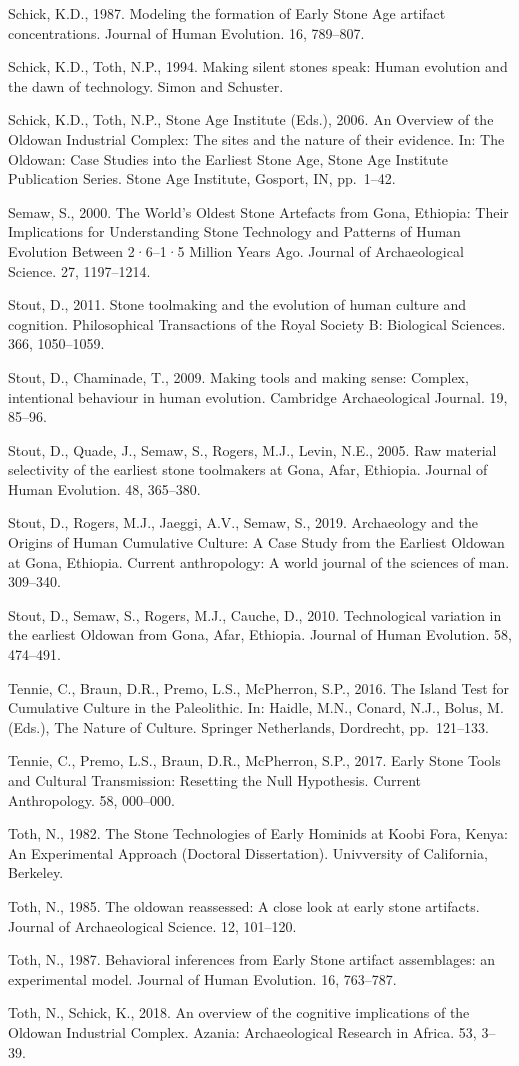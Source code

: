 \documentclass[]{elsarticle} %
\begin{document}
Schick, K.D., 1987. Modeling the formation of Early Stone Age artifact
concentrations. Journal of Human Evolution. 16, 789--807.

Schick, K.D., Toth, N.P., 1994. Making silent stones speak: Human
evolution and the dawn of technology. Simon and Schuster.

Schick, K.D., Toth, N.P., Stone Age Institute (Eds.), 2006. An Overview
of the Oldowan Industrial Complex: The sites and the nature of their
evidence. In: The Oldowan: Case Studies into the Earliest Stone Age,
Stone Age Institute Publication Series. Stone Age Institute, Gosport,
IN, pp.~1--42.

Semaw, S., 2000. The World's Oldest Stone Artefacts from Gona, Ethiopia:
Their Implications for Understanding Stone Technology and Patterns of
Human Evolution Between 2·6--1·5 Million Years Ago. Journal of
Archaeological Science. 27, 1197--1214.

Stout, D., 2011. Stone toolmaking and the evolution of human culture and
cognition. Philosophical Transactions of the Royal Society B: Biological
Sciences. 366, 1050--1059.

Stout, D., Chaminade, T., 2009. Making tools and making sense: Complex,
intentional behaviour in human evolution. Cambridge Archaeological
Journal. 19, 85--96.

Stout, D., Quade, J., Semaw, S., Rogers, M.J., Levin, N.E., 2005. Raw
material selectivity of the earliest stone toolmakers at Gona, Afar,
Ethiopia. Journal of Human Evolution. 48, 365--380.

Stout, D., Rogers, M.J., Jaeggi, A.V., Semaw, S., 2019. Archaeology and
the Origins of Human Cumulative Culture: A Case Study from the Earliest
Oldowan at Gona, Ethiopia. Current anthropology: A world journal of the
sciences of man. 309--340.

Stout, D., Semaw, S., Rogers, M.J., Cauche, D., 2010. Technological
variation in the earliest Oldowan from Gona, Afar, Ethiopia. Journal of
Human Evolution. 58, 474--491.

Tennie, C., Braun, D.R., Premo, L.S., McPherron, S.P., 2016. The Island
Test for Cumulative Culture in the Paleolithic. In: Haidle, M.N.,
Conard, N.J., Bolus, M. (Eds.), The Nature of Culture. Springer
Netherlands, Dordrecht, pp.~121--133.

Tennie, C., Premo, L.S., Braun, D.R., McPherron, S.P., 2017. Early Stone
Tools and Cultural Transmission: Resetting the Null Hypothesis. Current
Anthropology. 58, 000--000.

Toth, N., 1982. The Stone Technologies of Early Hominids at Koobi Fora,
Kenya: An Experimental Approach (Doctoral Dissertation). Univversity of
California, Berkeley.

Toth, N., 1985. The oldowan reassessed: A close look at early stone
artifacts. Journal of Archaeological Science. 12, 101--120.

Toth, N., 1987. Behavioral inferences from Early Stone artifact
assemblages: an experimental model. Journal of Human Evolution. 16,
763--787.

Toth, N., Schick, K., 2018. An overview of the cognitive implications of
the Oldowan Industrial Complex. Azania: Archaeological Research in
Africa. 53, 3--39.
\end{document}
